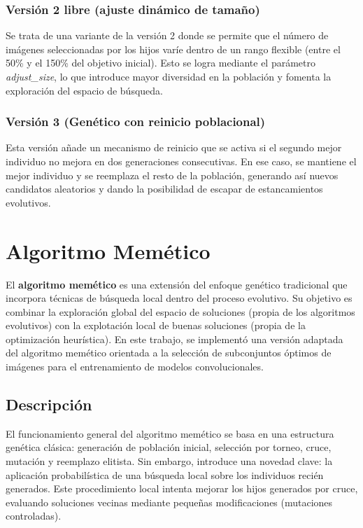 \subsubsection{Versión 2 libre (ajuste dinámico de tamaño)}
Se trata de una variante de la versión 2 donde se permite que el número de imágenes seleccionadas por los hijos varíe
dentro de un rango flexible (entre el 50\% y el 150\% del objetivo inicial).
Esto se logra mediante el parámetro \textit{adjust\_size}, lo que introduce mayor diversidad en la población y fomenta la exploración del espacio de búsqueda.

\subsubsection{Versión 3 (Genético con reinicio poblacional)}
Esta versión añade un mecanismo de reinicio que se activa si el segundo mejor individuo no mejora en dos generaciones consecutivas.
En ese caso, se mantiene el mejor individuo y se reemplaza el resto de la población,
generando así nuevos candidatos aleatorios y dando la posibilidad de escapar de estancamientos evolutivos.


\section{Algoritmo Memético}\label{sec:algoritmo-memetico}
El \textbf{algoritmo memético} es una extensión del enfoque genético tradicional que incorpora técnicas de búsqueda
local dentro del proceso evolutivo.
Su objetivo es combinar la exploración global del espacio de soluciones (propia de los algoritmos evolutivos)
con la explotación local de buenas soluciones (propia de la optimización heurística).
En este trabajo, se implementó una versión adaptada del algoritmo memético orientada a la selección de subconjuntos
óptimos de imágenes para el entrenamiento de modelos convolucionales.


\subsection{Descripción}\label{subsec:descripcion4}
El funcionamiento general del algoritmo memético se basa en una estructura genética clásica:
generación de población inicial, selección por torneo, cruce, mutación y reemplazo elitista.
Sin embargo, introduce una novedad clave: la aplicación probabilística de una búsqueda local sobre los individuos recién generados.
Este procedimiento local intenta mejorar los hijos generados por cruce, evaluando soluciones vecinas
mediante pequeñas modificaciones (mutaciones controladas).


